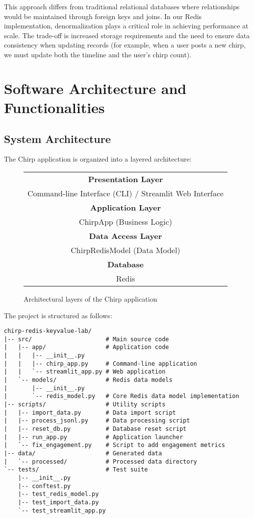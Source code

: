 \documentclass[a4paper,11pt]{article}
\begin{document}
This approach differs from traditional relational databases where relationships would be maintained through foreign keys and joins. In our Redis implementation, denormalization plays a critical role in achieving performance at scale. The trade-off is increased storage requirements and the need to ensure data consistency when updating records (for example, when a user posts a new chirp, we must update both the timeline and the user's chirp count).

\newpage
\section{Software Architecture and Functionalities}

\subsection{System Architecture}
The Chirp application is organized into a layered architecture:

\begin{figure}[H]
    \centering
    \begin{tabular}{|c|}
        \hline
        \textbf{Presentation Layer} \\
        Command-line Interface (CLI) / Streamlit Web Interface \\
        \hline
        \textbf{Application Layer} \\
        ChirpApp (Business Logic) \\
        \hline
        \textbf{Data Access Layer} \\
        ChirpRedisModel (Data Model) \\
        \hline
        \textbf{Database} \\
        Redis \\
        \hline
    \end{tabular}
    \caption{Architectural layers of the Chirp application}
\end{figure}

The project is structured as follows:

\begin{verbatim}
chirp-redis-keyvalue-lab/
|-- src/                     # Main source code 
|   |-- app/                 # Application code
|   |   |-- __init__.py
|   |   |-- chirp_app.py     # Command-line application
|   |   `-- streamlit_app.py # Web application
|   `-- models/              # Redis data models
|       |-- __init__.py      
|       `-- redis_model.py   # Core Redis data model implementation
|-- scripts/                 # Utility scripts
|   |-- import_data.py       # Data import script
|   |-- process_jsonl.py     # Data processing script
|   |-- reset_db.py          # Database reset script
|   |-- run_app.py           # Application launcher
|   `-- fix_engagement.py    # Script to add engagement metrics
|-- data/                    # Generated data
|   `-- processed/           # Processed data directory
`-- tests/                   # Test suite
    |-- __init__.py
    |-- conftest.py
    |-- test_redis_model.py
    |-- test_import_data.py
    `-- test_streamlit_app.py
\end{verbatim}
\end{document}

